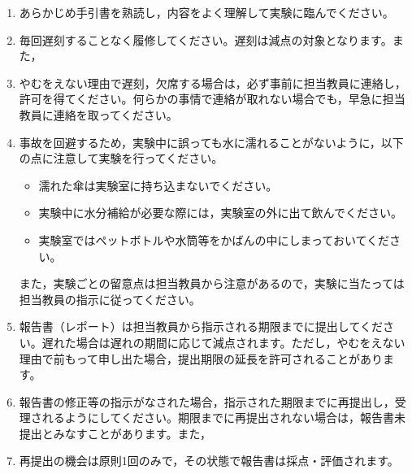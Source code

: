 

\begin{enumerate}[label=\textbf{\arabic*.}, leftmargin=*, labelsep=0.8em, itemsep=0.6\baselineskip]
  \item あらかじめ手引書を熟読し，内容をよく理解して実験に臨んでください。
  \item 毎回遅刻することなく履修してください。遅刻は減点の対象となります。また，
  \item やむをえない理由で遅刻，欠席する場合は，必ず事前に担当教員に連絡し，許可を得てください。何らかの事情で連絡が取れない場合でも，早急に担当教員に連絡を取ってください。
  \item {}事故を回避するため，実験中に誤っても水に濡れることがないように，以下の点に注意して実験を行ってください。
    \begin{itemize}
      \item 濡れた傘は実験室に持ち込まないでください。
      \item 実験中に水分補給が必要な際には，実験室の外に出て飲んでください。
      \item 実験室ではペットボトルや水筒等をかばんの中にしまっておいてください。
    \end{itemize}
    また，実験ごとの留意点は担当教員から注意があるので，実験に当たっては担当教員の指示に従ってください。
  \item 報告書（レポート）は担当教員から指示される期限までに提出してください。遅れた場合は遅れの期間に応じて減点されます。ただし，やむをえない理由で前もって申し出た場合，提出期限の延長を許可されることがあります。
  \item 報告書の修正等の指示がなされた場合，指示された期限までに再提出し，受理されるようにしてください。期限までに再提出されない場合は，報告書未提出とみなすことがあります。また，
  \item 再提出の機会は原則1回のみで，その状態で報告書は採点・評価されます。
\end{enumerate}
